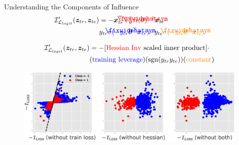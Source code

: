 \documentclass[blue]{beamer}
\newcommand\lowerwidehatsym{%
  \text{\smash{\raisebox{-1.3ex}{%
    $\fixwidehatsym$}}}}
\newcommand\fixwidehat[1]{%
  \mathchoice
    {\accentset{\displaystyle\lowerwidehatsym}{#1}}
    {\accentset{\textstyle\lowerwidehatsym}{#1}}
    {\accentset{\scriptstyle\lowerwidehatsym}{#1}}
    {\accentset{\scriptscriptstyle\lowerwidehatsym}{#1}}
}
\begin{document}
\begin{frame}{Understanding the Components of Influence}
\begin{align}\label{logit_I_loss2}
\vspace{-0.15in}
\mathcal{I}'_{\mathcal{L}_{logit}}(\bm{z}_{tr}, \bm{z}_{te}) &= -\bm{x}_{tr}^{\top}\textcolor{red}{\nabla_{\bm{\theta}}^2 R(\fixwidehat{\bm{\theta}})^{-1}} \bm{x}_{te}\cdot\\
&y_{tr}\textcolor{blue}{\sigma(-y_{tr}\fixwidehat{\bm{\theta}}^{\top}\bm{x}_{tr})}\cdot y_{te}\textcolor{orange}{\sigma(-y_{te}\fixwidehat{\bm{\theta}}^{\top}\bm{x}_{te})}\notag
\vspace{-0.15in}
\end{align}

\begin{align}\label{logit_I_loss2}
\vspace{-0.15in}
\mathcal{I}'_{\mathcal{L}_{logit}}(\bm{z}_{tr}, \bm{z}_{te}) &= -[\textcolor{red}{\text{Hessian Inv}} \text{ scaled inner product}]\cdot \\
&(\textcolor{blue}{\text{training leverage}})(\text{sgn}(y_{tr}y_{te}))(\textcolor{orange}{\text{constant}})\notag
\vspace{-0.15in}
\end{align}
   
   
\begin{figure}[ht]
\vskip 0.0in
\begin{center}
\centerline{\includegraphics[width=4.5in]{fig-components}}
\vskip -0.1in
\label{logit_components}
\end{center}
\vskip -0.25in
\end{figure}
\end{frame}
\end{document}
